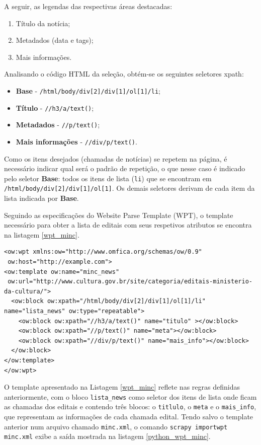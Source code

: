 A seguir, as legendas das respectivas áreas destacadas:

\begin{enumerate}
	\item Título da notícia;
	\item Metadados (data e tags);
	\item Mais informações.
\end{enumerate}

Analisando o código HTML da seleção, obtém-se os seguintes seletores \gls{xpath}:

\begin{itemize}
	\item \textbf{Base} - \texttt{/html/body/div[2]/div[1]/ol[1]/li};
	\item \textbf{Título} - \texttt{//h3/a/text()};
	\item \textbf{Metadados} - \texttt{//p/text()};
	\item \textbf{Mais informações} - \texttt{//div/p/text()}.
\end{itemize}

Como os itens desejados (chamadas de notícias) se repetem na página, é necessário indicar qual será o padrão de repetição, o que nesse caso é indicado pelo seletor \textbf{Base}: todos os itens de lista (\texttt{li}) que se encontram em \texttt{/html/body/div[2]/div[1]/ol[1]}. Os demais seletores derivam de cada item da lista indicada por \textbf{Base}.

Seguindo as especificações do Website Parse Template (WPT), o template necessário para obter a lista de editais com seus respetivos atributos se encontra na listagem \ref{wpt_minc}.

\begin{lstlisting}[label=wpt_minc]
<ow:wpt xmlns:ow="http://www.omfica.org/schemas/ow/0.9"
 ow:host="http://example.com">
<ow:template ow:name="minc_news" 
 ow:url="http://www.cultura.gov.br/site/categoria/editais-ministerio-da-cultura/">
  <ow:block ow:xpath="/html/body/div[2]/div[1]/ol[1]/li" name="lista_news" ow:type="repeatable">
    <ow:block ow:xpath="//h3/a/text()" name="titulo" ></ow:block>
    <ow:block ow:xpath="//p/text()" name="meta"></ow:block>
    <ow:block ow:xpath="//div/p/text()" name="mais_info"></ow:block>
  </ow:block>
</ow:template> 
</ow:wpt>
\end{lstlisting}

O template apresentado na Listagem \ref{wpt_minc} reflete nas regras definidas anteriormente, com o bloco \texttt{lista\_news} como seletor dos itens de lista onde ficam as chamadas dos editais e contendo três blocos: o \texttt{titlulo}, o \texttt{meta} e o \texttt{mais\_info}, que representam as informações de cada chamada edital. Tendo salvo o template anterior num arquivo chamado \texttt{minc.xml}, o comando \texttt{scrapy importwpt minc.xml} exibe a saída mostrada na listagem \ref{python_wpt_minc}.

